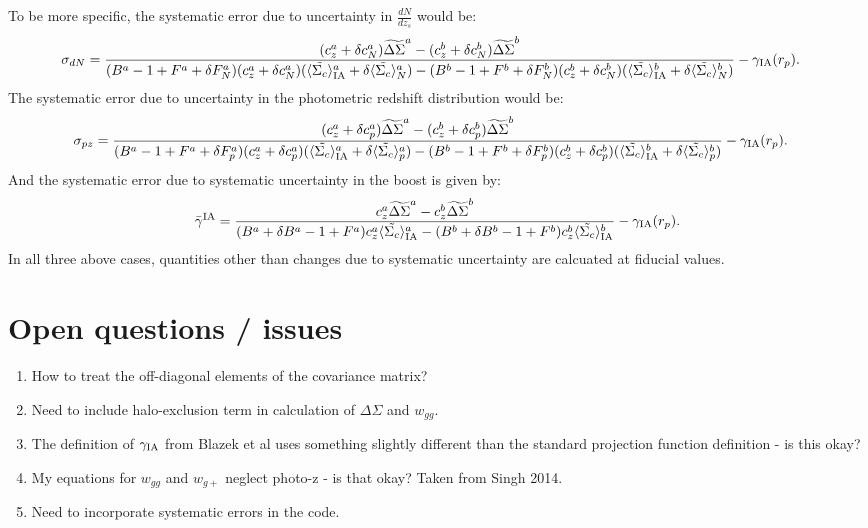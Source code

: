 \documentclass[onecolumn,amsmath,aps,fleqn, superscriptaddress]{revtex4}
\begin{document}
To be more specific, the systematic error due to uncertainty in $\frac{dN}{dz_s}$ would be:
\begin{align}
\sigma_{dN} &= \frac{(c^a_{z} + \delta c_{N}^{a}) \widetilde{\Delta\Sigma}^a - (c^b_{z} + \delta c_{N}^{b}) \widetilde{\Delta\Sigma}^b}{(B^a-1+F^a + \delta F^a_{N})(c^a_{z} + \delta c_{N}^{a}) (\langle \tilde{\Sigma_c}\rangle_{\rm IA}^a + \delta \langle \tilde{\Sigma_c}\rangle_{N}^{a}) -(B^b-1+F^b + \delta F^b_{N})(c^b_{z} + \delta c_{N}^{b}) (\langle \tilde{\Sigma_c}\rangle_{\rm IA}^b + \delta \langle \tilde{\Sigma_c}\rangle_{N}^{b})} - \gamma_{\rm IA}(r_p).
\label{sigmadNsys}
\end{align}
The systematic error due to uncertainty in the photometric redshift distribution would be:
\begin{align}
\sigma_{pz} &= \frac{(c^a_{z} + \delta c_{p}^{a}) \widetilde{\Delta\Sigma}^a - (c^b_{z} + \delta c_{p}^{b}) \widetilde{\Delta\Sigma}^b}{(B^a-1+F^a + \delta F^a_{p})(c^a_{z} + \delta c_{p}^{a}) (\langle \tilde{\Sigma_c}\rangle_{\rm IA}^a + \delta \langle \tilde{\Sigma_c}\rangle_{p}^{a}) -(B^b-1+F^b + \delta F^b_{p})(c^b_{z} + \delta c_{p}^{b}) (\langle \tilde{\Sigma_c}\rangle_{\rm IA}^b + \delta \langle \tilde{\Sigma_c}\rangle_{p}^{b})} - \gamma_{\rm IA}(r_p).
\label{sigmapzsys}
\end{align}
And the systematic error due to systematic uncertainty in the boost is given by: 
\begin{equation}
\bar{\gamma}^{\rm IA} = \frac{c_z^a \widetilde{\Delta\Sigma}^a - c_z^b \widetilde{\Delta\Sigma}^b}{(B^a +\delta B^a-1+F^a)c_z^a \langle \tilde{\Sigma_c}\rangle_{\rm IA}^a -(B^b + \delta B^b-1+F^b)c_z^b \langle \tilde{\Sigma_c}\rangle_{\rm IA}^b}- \gamma_{\rm IA}(r_p) .
\label{sigmaBsys}
\end{equation}
In all three above cases, quantities other than changes due to systematic uncertainty are calcuated at fiducial values.


\section{Open questions / issues}
\begin{enumerate}
\item{How to treat the off-diagonal elements of the covariance matrix?}
\item{Need to include halo-exclusion term in calculation of $\Delta \Sigma$ and $w_{gg}$.}
\item{The definition of $\gamma_{\rm IA}$ from Blazek et al uses something slightly different than the standard projection function definition - is this okay?}
\item{My equations for $w_{gg}$ and $w_{g+}$ neglect photo-z - is that okay? Taken from Singh 2014.}
\item{Need to incorporate systematic errors in the code.}
\end{enumerate}











\end{document}
